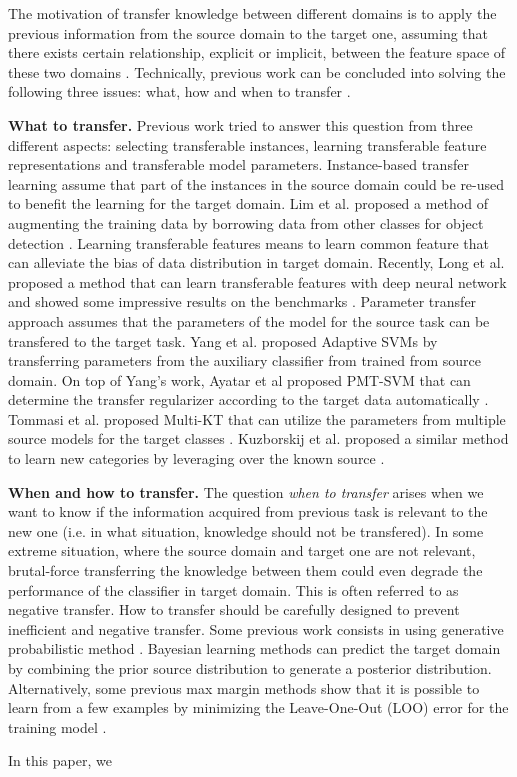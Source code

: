 The motivation of transfer knowledge between different domains is to apply the previous information from the source domain to the target one, assuming that there exists certain relationship, explicit or implicit, between the  feature space of these two domains \cite{pan2010survey}. Technically, previous work can be concluded into solving the following three issues: what, how and when to transfer \cite{tommasi2014learning}.


\textbf{What to transfer.} Previous work tried to answer this question from three different aspects: selecting transferable instances, learning transferable feature representations and transferable model parameters. Instance-based transfer learning assume that part of the instances in the source domain could be re-used to benefit the learning for the target domain. Lim et al. proposed a method of augmenting the training data by borrowing data from other classes for object detection \cite{lim2012transfer}. Learning transferable features means to learn common feature that can alleviate the bias of data distribution in target domain. Recently, Long et al. proposed a method that can learn transferable features with deep neural network and showed some impressive results on the  benchmarks \cite{LongICML15}. Parameter transfer
approach assumes that the parameters of the model for the source task can be transfered to the target task. Yang et al. proposed Adaptive SVMs by transferring parameters from the auxiliary classifier from trained from source domain\cite{yang2007cross}. On top of Yang's work, Ayatar et al proposed PMT-SVM that can determine the transfer regularizer according to the target data automatically \cite{aytar2011tabula}. Tommasi et al. proposed Multi-KT that can utilize the parameters from multiple source models for the target classes  \cite{tommasi2014learning}.
Kuzborskij et al. proposed a similar method to learn new categories by leveraging over the known source \cite{kuzborskij2013n}.

\textbf{When and how to transfer.} The question \textit{when to transfer} arises when we want to know if the information acquired from previous task is relevant to the new one (i.e. in what situation, knowledge should not be transfered). In some extreme situation, where the source domain and target one are not relevant, brutal-force transferring the knowledge between them could even degrade the performance of the classifier in target domain. This is often referred to as negative transfer. How to transfer should be carefully designed to prevent inefficient and negative transfer. Some previous work consists in using generative probabilistic method \cite{davis2009deep} \cite{wang2014active} \cite{zhou2014multi}.  Bayesian learning methods can predict the target domain by combining the prior source distribution to generate a posterior distribution. Alternatively, some previous max margin methods show that it is possible to learn from a few examples by minimizing the  Leave-One-Out (LOO) error for the training model \cite{kuzborskij2013n} \cite{tommasi2010safety}. 

In this paper, we 
